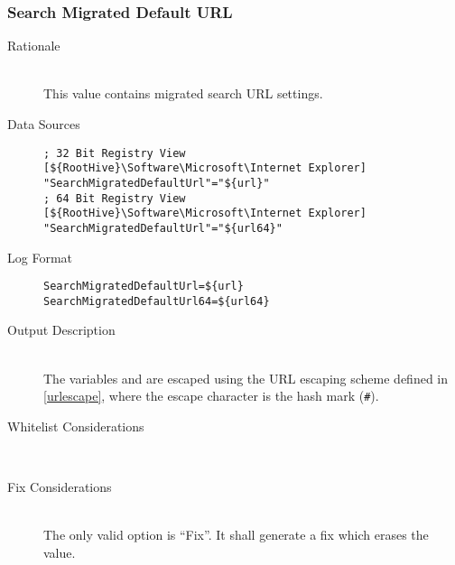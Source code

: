 \subsubsection{Search Migrated Default URL}
\begin{description}
\item[Rationale]  \hfill \\ This value contains migrated search URL settings.

\item[Data Sources] \hfill
\vspace{-\baselineskip}
\begin{verbatim}
; 32 Bit Registry View
[${RootHive}\Software\Microsoft\Internet Explorer]
"SearchMigratedDefaultUrl"="${url}"
; 64 Bit Registry View
[${RootHive}\Software\Microsoft\Internet Explorer]
"SearchMigratedDefaultUrl"="${url64}"
\end{verbatim}
\item[Log Format] \hfill
\vspace{-\baselineskip}
\begin{verbatim} 
SearchMigratedDefaultUrl=${url}
SearchMigratedDefaultUrl64=${url64}
\end{verbatim}
\item[Output Description] \hfill \\
The variables  and  are escaped using the URL escaping
scheme defined in \ref{urlescape}, where the escape character is the hash mark
(\verb|#|).
\item[Whitelist Considerations] \hfill \\

\item[Fix Considerations] \hfill \\
The only valid option is ``Fix''. It shall generate a fix which erases the value.
\end{description}

